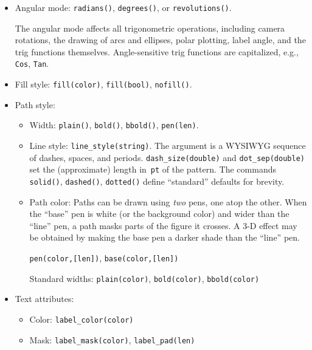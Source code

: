 \documentclass[12pt,letterpaper]{book}
\newcommand{\code}[1]{\texttt{#1}}
\begin{document}
\begin{itemize}

\item Angular mode: \code{radians()}, \code{degrees()}, or
  \code{revolutions()}.

  The angular mode affects all trigonometric operations, including
  camera rotations, the drawing of arcs and ellipses, polar plotting,
  label angle, and the trig functions themselves. Angle-sensitive trig
  functions are capitalized, e.g., \code{Cos}, \code{Tan}.

\item Fill style: \code{fill(color)}, \code{fill(bool)},
  \code{nofill()}.

\item Path style:

  \begin{itemize}

  \item Width: \code{plain()}, \code{bold()}, \code{bbold()},
    \code{pen(len)}.

  \item Line style: \code{line\_style(string)}. The argument is a
    WYSIWYG sequence of dashes, spaces, and periods.
    \code{dash\_size(double)} and \code{dot\_sep(double)} set the
    (approximate) length in~\code{pt} of the pattern.  The commands
    \code{solid()}, \code{dashed()}, \code{dotted()} define
    ``standard'' defaults for brevity.

  \item Path color:
    Paths can be drawn using \emph{two} pens, one atop the other. When
    the ``base'' pen is white (or the background color) and wider than
    the ``line'' pen, a path masks parts of the figure it crosses. A
    3-D effect may be obtained by making the base pen a darker shade
    than the ``line'' pen.

    \code{pen(color,[len])}, \code{base(color,[len])}

    Standard widths: \code{plain(color)}, \code{bold(color)},
    \code{bbold(color)}

  \end{itemize}

\item Text attributes:

  \begin{itemize}

  \item Color: \code{label\_color(color)}

  \item Mask: \code{label\_mask(color)}, \code{label\_pad(len)}


\end{itemize}
\end{itemize}
\end{document}
